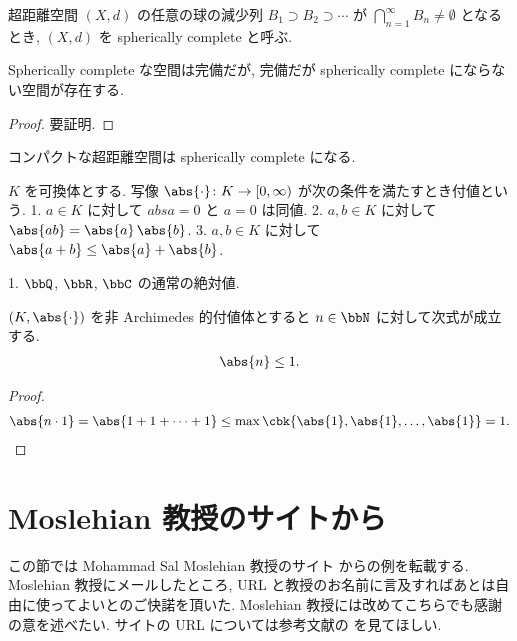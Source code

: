 \documentclass[openany, a4paper, oneside]{jsbook}
\begin{document}
\begin{defn}
超距離空間 $(X, d)$ の任意の球の減少列 $B_1 \supset B_2 \supset \cdots$ が
$\bigcap_{n=1}^{\infty} B_n \neq \emptyset$ となるとき, $(X, d)$ を spherically complete と呼ぶ.
\end{defn}
\begin{prop}
Spherically complete な空間は完備だが, 完備だが spherically complete にならない空間が存在する.
\end{prop}
\begin{proof}
要証明.
\end{proof}
\begin{prop}
コンパクトな超距離空間は spherically complete になる.
\end{prop}

\begin{defn}
$K$ を可換体とする.
写像 $\abs{\cdot} \colon K \to [0, \infty)$ が次の条件を満たすとき付値という.
1. $a \in K$ に対して $abs{a} = 0$ と $a = 0$ は同値.
2. $a, b \in K$ に対して $\abs{ab} = \abs{a} \, \abs{b}$.
3. $a, b \in K$ に対して $\abs{a + b} \leq \abs{a} + \abs{b}$.
\end{defn}
\begin{ex}[付値の例]
1. $\bbQ$, $\bbR$, $\bbC$ の通常の絶対値.
\end{ex}

\begin{prop}
$(K, \abs{\cdot})$ を非 Archimedes 的付値体とすると $n \in \bbN$ に対して次式が成立する.
\begin{align}
 \abs{n}
 \leq
 1.
\end{align}
\begin{proof}
\begin{align}
 \abs{n \cdot 1}
 =
 \abs{1 + 1 + \cdots + 1}
 \leq
 \max \cbk{\abs{1}, \abs{1}, \dots, \abs{1}}
 =
 1.
\end{align}
\end{proof}
\end{prop}
\section{Moslehian 教授のサイトから}

この節では Mohammad Sal Moslehian 教授のサイト \cite{MohammadSalMoslehian1} からの例を転載する.
Moslehian 教授にメールしたところ, URL と教授のお名前に言及すればあとは自由に使ってよいとのご快諾を頂いた.
Moslehian 教授には改めてこちらでも感謝の意を述べたい.
サイトの URL については参考文献の \cite{MohammadSalMoslehian1} を見てほしい.
\end{document}
